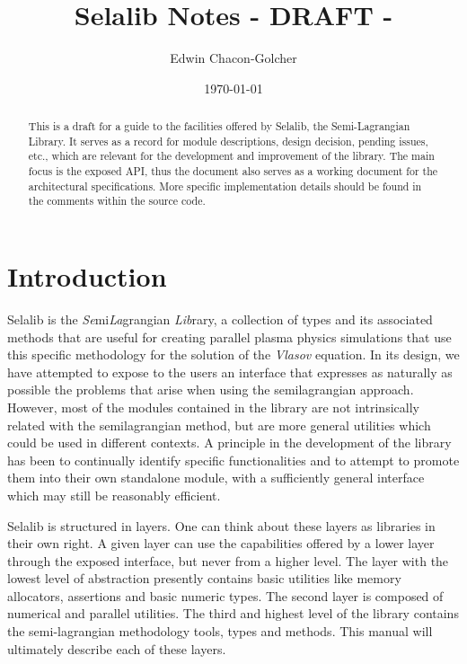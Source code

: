 \documentclass[]{report}   %
\begin{document}
\title{Selalib Notes - DRAFT -}   
\author{Edwin Chacon-Golcher}        
\date{\today}    
\maketitle

\begin{abstract}
 This is a draft for a guide to the facilities offered by Selalib, the Semi-Lagrangian Library. It serves as a record for module descriptions, design decision, pending issues, etc., which are relevant for the development and improvement of the library. The main focus is the exposed API, thus the document also serves as a working document for the architectural specifications. More specific implementation details should be found in the comments within the source code. 
\end{abstract}

\tableofcontents

\chapter{Introduction}             %
Selalib is the \emph{Se}mi\emph{La}grangian \emph{Lib}rary, a collection of types and its associated methods that are useful for creating parallel plasma physics simulations that use this specific methodology for the solution of the \emph{Vlasov} equation. In its design, we have attempted to expose to the users an interface that expresses as naturally as possible the problems that arise when using the semilagrangian approach. However, most of the modules contained in the library are not intrinsically related with the semilagrangian method, but are more general utilities which could be used in different contexts. A principle in the development of the library has been to continually identify specific functionalities and to attempt to promote them into their own standalone module, with a sufficiently general interface which may still be reasonably efficient.

Selalib is structured in layers. One can think about these layers as libraries in their own right. A given layer can use the capabilities offered by a lower layer through the exposed interface, but never from a higher level. The layer with the lowest level of abstraction presently contains basic utilities like memory allocators, assertions and basic numeric types. The second layer is composed of numerical and parallel utilities. The third and highest level of the library contains the semi-lagrangian methodology tools, types and methods. This manual will ultimately describe each of these layers.
\end{document}
